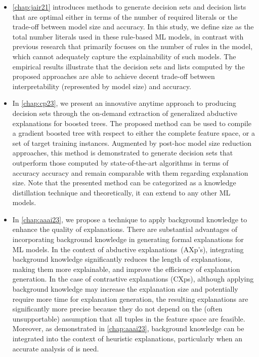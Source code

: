 \begin{itemize}
	\item \autoref{chap:jair21} introduces methods to generate decision sets and decision lists 
		that are optimal either in terms of the number of required literals or 
		the trade-off between model size and accuracy.
		In this study, we define size as the total number literals used in these rule-based ML models,
		in contrast with previous research that primarily focuses on the number of rules in
		the model, which cannot adequately capture the explainability of such models.
		The empirical results illustrate that the decision sets and lists computed by the
		proposed approaches are able to achieve decent trade-off between interpretability (represented by model size) and accuracy.

	\item In \autoref{chap:cp23}, we present an innovative anytime approach to producing decision sets
		through the on-demand extraction of generalized abductive explanations for boosted
		trees.
		The proposed method can be used to compile a gradient boosted tree
		with respect to either the complete feature space, or a set of
		target training instances.
		Augmented by post-hoc model size reduction approaches, 
		this method is demonstrated to generate decision sets that outperform those
		computed by state-of-the-art algorithms in terms of accuracy accuracy and remain 
		comparable with them regarding explanation size.
		Note that the presented method can be categorized as a knowledge distillation technique and theoretically, 
		it can extend to any other ML models.

	\item In \autoref{chap:aaai23}, we propose a technique to apply background knowledge to enhance 
		the quality of explanations. 
		There are substantial advantages of incorporating background knowledge in generating
		formal explanations for ML models.
		In the context of abductive explanations~(AXp's), 
		integrating background knowledge significantly reduces the length of explanations, 
		making them more explainable, and improve the efficiency of explanation generation.
		In the case of contrastive explanations (CXps), although applying background knowledge may 
		increase the explanation size and potentially require more time for explanation generation, 
		the resulting explanations are significantly more precise because they do not 
		depend on the (often unsupportable) assumption that all tuples in the feature space 
		are feasible.
		Moreover, as demonstrated in \autoref{chap:aaai23}, background knowledge can be 
		integrated into the context of heuristic explanations, particularly when an accurate
		analysis of is need.


\end{itemize}
